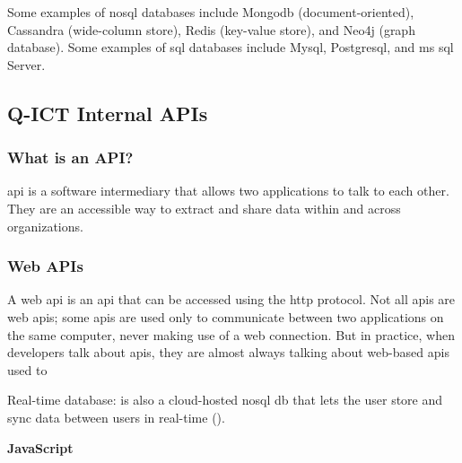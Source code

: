 \begin{multicols}{2}
      Some examples of \acrshort{nosql} databases include Mongo\acrshort{db} (document-oriented), Cassandra (wide-column store), Redis
      (key-value store), and Neo4j (graph database). Some examples of \acrshort{sql} databases include My\acrshort{sql},
      Postgres\acrshort{ql}, and \acrshort{ms} \acrshort{sql} Server.
      \subsection{Q-ICT Internal APIs}
      \subsubsection{What is an API?}
      \acrshort{api} is a software intermediary that allows two applications to talk to each other. They are an
      accessible way to extract and share data within and across organizations.
      \subsubsection{Web APIs}
      A web \acrshort{api} is an \acrshort{api} that can be accessed using the \acrshort{http} protocol. Not all
      \acrshort{api}s are web \acrshort{api}s; some \acrshort{api}s are used only to communicate between two
      applications on the same computer, never making use of a web connection. But in practice, when developers talk
      about \acrshort{api}s, they are almost always talking about web-based \acrshort{api}s used to


      \item Real-time database: is also a cloud-hosted \acrshort{nosql} \acrshort{db} that lets the user store
      and sync data between users in real-time (\textit{\cite{realtimeDatabase}}).

      \textbf{JavaScript}


\end{multicols}
